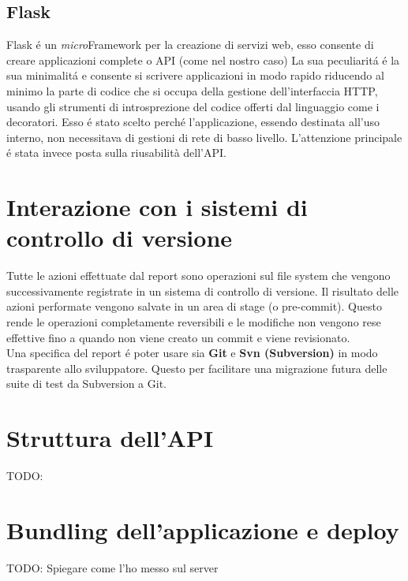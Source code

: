         \subsection{Flask}  
            Flask \'e un \textit{micro}Framework per la creazione di servizi web, esso consente di creare applicazioni complete o API (come nel nostro caso)
            La sua peculiarit\'a \'e la sua minimalit\'a e consente si scrivere applicazioni in modo rapido riducendo al minimo la parte di codice che si occupa della gestione dell'interfaccia HTTP, usando gli strumenti di introsprezione del codice offerti dal linguaggio come i decoratori.
            Esso \'e stato scelto perch\'e l'applicazione, essendo destinata all'uso interno, non necessitava di gestioni di rete di basso livello.
            L'attenzione principale \'e stata invece posta sulla riusabilità dell'API.

    \section{Interazione con i sistemi di controllo di versione}           
        Tutte le azioni effettuate dal report sono operazioni sul file system che vengono successivamente registrate in un sistema di controllo di versione.
        Il risultato delle azioni performate vengono salvate in un area di stage (o pre-commit).
        Questo rende le operazioni completamente reversibili e le modifiche non vengono rese effettive fino a quando non viene creato un commit e viene revisionato.\\
        Una specifica del report \'e poter usare sia \textbf{Git} e \textbf{Svn (Subversion)} in modo trasparente allo sviluppatore.
        Questo per facilitare una migrazione futura delle suite di test da Subversion a Git.
            
    \section{Struttura dell'API}
        TODO:
    
    \section{Bundling dell'applicazione e deploy}
        TODO: Spiegare come l'ho messo sul server

